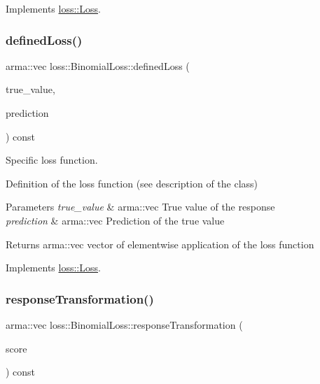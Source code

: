 Implements \mbox{\hyperlink{classloss_1_1_loss_a267a4de70747ade4b2d84ce35a448979}{loss\+::\+Loss}}.

\mbox{\label{classloss_1_1_binomial_loss_aa4570a731257ba43b1b4d6099c0a4515}} 
\subsubsection{\texorpdfstring{defined\+Loss()}{definedLoss()}}
{\footnotesize\ttfamily arma\+::vec loss\+::\+Binomial\+Loss\+::defined\+Loss (\begin{DoxyParamCaption}\item[{const arma\+::vec \&}]{true\+\_\+value,  }\item[{const arma\+::vec \&}]{prediction }\end{DoxyParamCaption}) const\hspace{0.3cm}{\ttfamily [virtual]}}



Specific loss function. 

Definition of the loss function (see description of the class)


\begin{DoxyParams}{Parameters}
{\em true\+\_\+value} & {\ttfamily arma\+::vec} True value of the response \\
\hline
{\em prediction} & {\ttfamily arma\+::vec} Prediction of the true value\\
\hline
\end{DoxyParams}
\begin{DoxyReturn}{Returns}
{\ttfamily arma\+::vec} vector of elementwise application of the loss function 
\end{DoxyReturn}


Implements \mbox{\hyperlink{classloss_1_1_loss_ae9f94dd9b8311397583ba3a9cb485e94}{loss\+::\+Loss}}.

\mbox{\label{classloss_1_1_binomial_loss_a6fb5f28518ac455cb192441660e7b997}} 
\subsubsection{\texorpdfstring{response\+Transformation()}{responseTransformation()}}
{\footnotesize\ttfamily arma\+::vec loss\+::\+Binomial\+Loss\+::response\+Transformation (\begin{DoxyParamCaption}\item[{const arma\+::vec \&}]{score }\end{DoxyParamCaption}) const\hspace{0.3cm}{\ttfamily [virtual]}}



